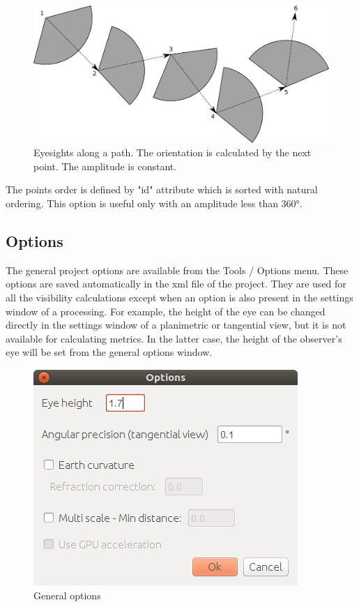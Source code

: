 \documentclass{report}
\begin{document}
\begin{figure}[H]
	\includegraphics[scale=0.8]{img/path_orien.pdf} 
	\caption{Eyesights along a path. The orientation is calculated by the next point. The amplitude is constant.}
	\label{path_orien}
\end{figure}

The points order is defined by "id" attribute which is sorted with natural ordering.
This option is useful only with an amplitude less than 360°.


\subsection{Options}
\label{options}
The general project options are available from the Tools / Options menu.
These options are saved automatically in the xml file of the project. They are used for all the visibility calculations except when an option is also present in the settings window of a processing. For example, the height of the eye can be changed directly in the settings window of a planimetric or tangential view, but it is not available for calculating metrics. In the latter case, the height of the observer's eye will be set from the general options window.

\begin{figure}[H]
	\includegraphics[scale=0.5]{img/options-en.png} 
	\caption{General options}
\end{figure}
\end{document}
